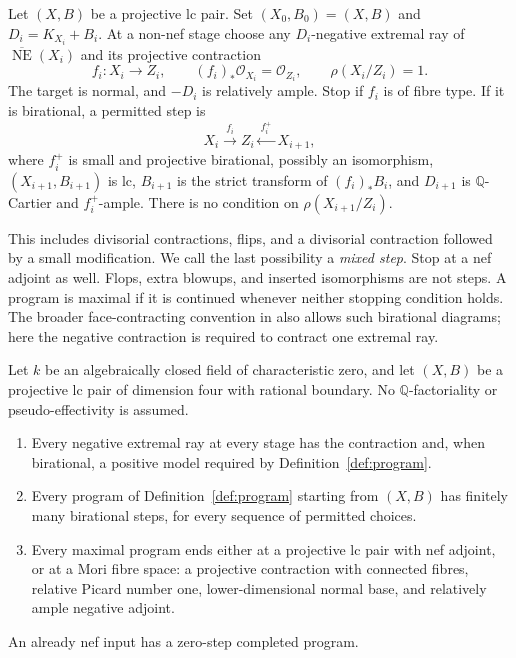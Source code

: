 \begin{definition}\label{def:program}
Let $(X,B)$ be a projective lc pair. Set $(X_0,B_0)=(X,B)$ and $D_i=K_{X_i}+B_i$. At a non-nef stage choose any $D_i$-negative extremal ray of $\overline{\operatorname{NE}}(X_i)$ and its projective contraction
\[
 f_i:X_i\longrightarrow Z_i,
 \qquad (f_i)_*\mathcal O_{X_i}=\mathcal O_{Z_i},
 \qquad \rho(X_i/Z_i)=1.
\]
The target is normal, and $-D_i$ is relatively ample. Stop if $f_i$ is of fibre type. If it is birational, a permitted step is
\[
 X_i\xrightarrow{\ f_i\ }Z_i
 \xleftarrow{\ f_i^+\ }X_{i+1},
\]
where $f_i^+$ is small and projective birational, possibly an isomorphism, $(X_{i+1},B_{i+1})$ is lc, $B_{i+1}$ is the strict transform of $(f_i)_*B_i$, and $D_{i+1}$ is $\mathbb Q$-Cartier and $f_i^+$-ample. There is no condition on $\rho(X_{i+1}/Z_i)$.

This includes divisorial contractions, flips, and a divisorial contraction followed by a small modification. We call the last possibility a \emph{mixed step}. Stop at a nef adjoint as well. Flops, extra blowups, and inserted isomorphisms are not steps. A program is maximal if it is continued whenever neither stopping condition holds. The broader face-contracting convention in \cite[Definition~2.5]{HanLiuZhuang2025} also allows such birational diagrams; here the negative contraction is required to contract one extremal ray.
\end{definition}

\begin{theorem}\label{thm:main}
Let $k$ be an algebraically closed field of characteristic zero, and let $(X,B)$ be a projective lc pair of dimension four with rational boundary. No $\mathbb Q$-factoriality or pseudo-effectivity is assumed.
\begin{enumerate}[label=\textup{(\roman*)}]
\item Every negative extremal ray at every stage has the contraction and, when birational, a positive model required by Definition~\ref{def:program}.
\item Every program of Definition~\ref{def:program} starting from $(X,B)$ has finitely many birational steps, for every sequence of permitted choices.
\item Every maximal program ends either at a projective lc pair with nef adjoint, or at a Mori fibre space: a projective contraction with connected fibres, relative Picard number one, lower-dimensional normal base, and relatively ample negative adjoint.
\end{enumerate}
An already nef input has a zero-step completed program.
\end{theorem}

